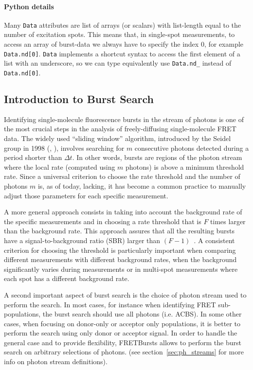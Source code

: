 \paragraph{Python details}
Many \verb|Data| attributes are list of arrays (or scalars) with list-length
equal to the number of excitation spots. This means that, in
single-spot measurements, to access an array of burst-data
we always have to specify the index 0, for example \verb|Data.nd[0]|.
\verb|Data| implements a shortcut syntax to access the first element of a list
with an underscore, so we can type equivalently use
\verb|Data.nd_| instead of \verb|Data.nd[0]|.

\subsection{Introduction to Burst Search}
\label{sec:burstsearch_intro}

Identifying single-molecule fluorescence bursts in the stream of photons is
one of the most crucial steps in the analysis of freely-diffusing single-molecule FRET data.
The widely used ``sliding window'' algorithm, introduced by the Seidel group in 1998
(\cite{Eggeling_1998}, \cite{Fries_1998}), involves searching for
$m$ consecutive photons detected during a period shorter than
$\Delta t$. In other words, bursts are regions of the photon stream where the
local rate (computed using $m$ photons) is above a minimum threshold rate.
Since a universal criterion to choose the rate threshold and
the number of photons $m$ is, as of today, lacking, it has become a common
practice to manually adjust those parameters for each specific measurement.

A more general approach consists in taking into account the background rate of
the specific measurements and in choosing a rate threshold that is $F$ times
larger than the background rate. This approach assures that all the resulting bursts
have a signal-to-background ratio (SBR) larger than
$(F-1)$~\cite{Michalet_2012}. A consistent criterion for choosing the threshold is
particularly important when comparing different measurements with different background
rates, when the background significantly varies during measurements or in
multi-spot measurements where each spot has a different background rate.

A second important aspect of burst search is the choice of photon stream used
to perform the search.
In most cases, for instance when identifying FRET sub-populations,
the burst search should use all photons (i.e. ACBS). In some other cases, when focusing on
donor-only or acceptor only populations, it is better to perform the search using
only donor or acceptor signal.
In order to handle the general case and to provide flexibility,
FRETBursts allows to perform the burst search on arbitrary selections of photons.
(see section~\ref{sec:ph_streams} for more info on photon stream definitions).

